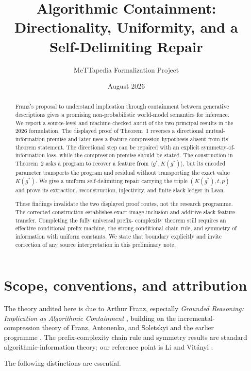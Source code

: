 \documentclass[11pt]{article}
\title{Algorithmic Containment:\\
Directionality, Uniformity, and a Self-Delimiting Repair}
\author{MeTTapedia Formalization Project}
\date{August 2026}
\newcommand{\pair}[2]{\langle #1,#2\rangle}
\newcommand{\K}{K}
\begin{document}
\maketitle

\begin{abstract}
Franz's proposal to understand implication through containment between
generative descriptions gives a promising non-probabilistic world-model
semantics for inference.  We report a source-level and machine-checked audit
of the two principal results in the 2026 formulation.  The displayed proof of
Theorem~1 reverses a directional mutual-information premise and later uses a
feature-compression hypothesis absent from its theorem statement.  The
directional step can be repaired with an explicit symmetry-of-information
loss, while the compression premise should be stated.  The construction in
Theorem~2 asks a program to recover a feature from
$\pair{g^*}{\K(g^*)}$, but its encoded parameter transports the program and
residual without transporting the exact value $\K(g^*)$.  We give a uniform
self-delimiting repair carrying the triple $(\K(g^*),t,p)$ and prove its
extraction, reconstruction, injectivity, and finite slack ledger in Lean.

These findings invalidate the two displayed proof routes, not the research
programme.  The corrected construction establishes exact image inclusion and
additive-slack feature transfer.  Completing the fully universal prefix-
complexity theorem still requires an effective conditional prefix machine,
the strong conditional chain rule, and symmetry of information with uniform
constants.  We state that boundary explicitly and invite correction of any
source interpretation in this preliminary note.
\end{abstract}

\section{Scope, conventions, and attribution}

The theory audited here is due to Arthur Franz, especially
\emph{Grounded Reasoning: Implication as Algorithmic Containment}
\cite{franz2026}, building on the incremental-compression theory of Franz,
Antonenko, and Soletskyi \cite{franz2021} and the earlier programme
\cite{franz2016}.  The prefix-complexity chain rule and symmetry results are
standard algorithmic-information theory; our reference point is
Li and Vit\'anyi \cite{livitanyi2019}.

The following distinctions are essential.
\end{document}
